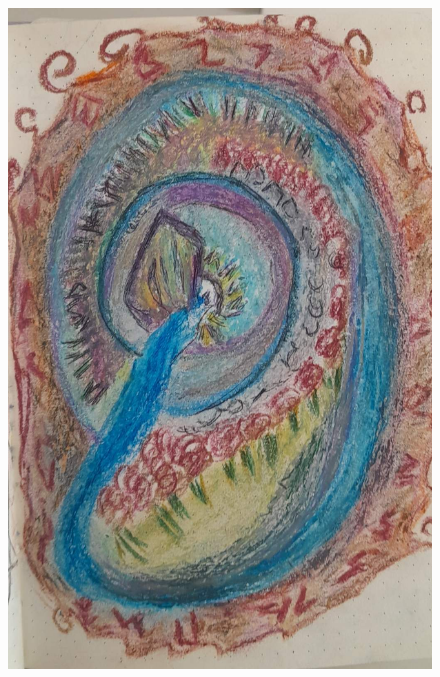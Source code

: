 \documentclass[12pt, a4paper, twoside]{book} %
\begin{document}
\begin{figure}[H]
	\centering
	\includegraphics[width=\textwidth]{./images/1f81324dd8b935.jpg}
\end{figure}
\end{document}
